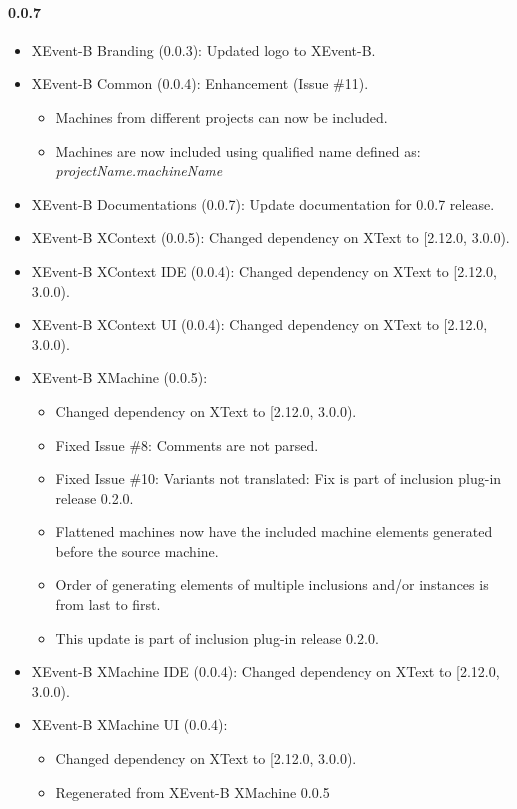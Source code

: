 \paragraph{0.0.7}
\begin{itemize}
\item XEvent-B Branding (0.0.3): Updated logo to XEvent-B.
\item XEvent-B Common (0.0.4): Enhancement (Issue \#11).
  \begin{itemize}
  \item Machines from different projects can now be included.

  \item  Machines are now included using qualified name defined as:
    \emph{projectName.machineName}
  \end{itemize}

\item  XEvent-B Documentations (0.0.7): Update documentation for 0.0.7 release.
\item  XEvent-B XContext (0.0.5): Changed dependency on XText to [2.12.0, 3.0.0).
\item  XEvent-B XContext IDE (0.0.4): Changed dependency on XText to [2.12.0, 3.0.0).
\item  XEvent-B XContext UI (0.0.4): Changed dependency on XText to [2.12.0, 3.0.0).
\item  XEvent-B XMachine (0.0.5):
  \begin{itemize}
  \item Changed dependency on XText to [2.12.0, 3.0.0).
  
  \item  Fixed Issue \#8: Comments are not parsed.
  
  \item  Fixed Issue \#10: Variants not translated: Fix is part of inclusion plug-in release 0.2.0.  
  
  \item  Flattened machines now have the included machine elements generated before the source machine.
  
  \item  Order of generating elements of multiple inclusions and/or instances is from last to first.
  
  \item  This update is part of inclusion plug-in release 0.2.0.
  \end{itemize}

\item  XEvent-B XMachine IDE (0.0.4): Changed dependency on XText to [2.12.0, 3.0.0).
\item  XEvent-B XMachine UI (0.0.4): 
  \begin{itemize}
  \item Changed dependency on XText to [2.12.0, 3.0.0).
  \item Regenerated from XEvent-B XMachine 0.0.5
  \end{itemize}
\end{itemize}

